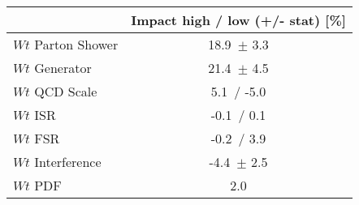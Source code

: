 \begin{tabular}{| l || c | }
\hline
& Impact high / low (+/- stat) [\%] \tabularnewline
\hline
$Wt$ Parton Shower & 18.9\, $\pm$  3.3 \tabularnewline
$Wt$ Generator & 21.4\, $\pm$  4.5 \tabularnewline
$Wt$ QCD Scale & 5.1\, / -5.0 \tabularnewline
$Wt$ ISR & -0.1\, / 0.1 \tabularnewline
$Wt$ FSR & -0.2\, / 3.9 \tabularnewline
$Wt$ Interference & -4.4\, $\pm$  2.5 \tabularnewline
$Wt$ PDF & 2.0 \tabularnewline
\hline
\end{tabular}
